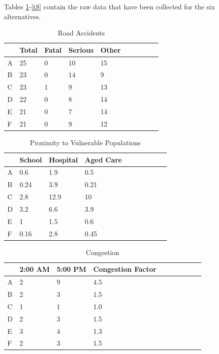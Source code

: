 \documentclass[11pt, a4paper]{article}
\begin{document}
    Tables \ref{t5}-\ref{t8} contain the raw data that have been collected for the six alternatives.

    \begin{table}[!ht]
        \centering
        \begin{tabular}{|l|l|l|l|l|l|l|l|l|l|}
        \hline
            ~ & Total & Fatal & Serious & Other       \\ \hline
            A & 25 & 0 & 10 & 15       \\ \hline
            B & 23 & 0 & 14 & 9       \\ \hline
            C & 23 & 1 & 9 & 13       \\ \hline
            D & 22 & 0 & 8 & 14       \\ \hline
            E & 21 & 0 & 7 & 14       \\ \hline
            F & 21 & 0 & 9 & 12       \\ \hline
        \end{tabular}
        \caption{Road Accidents}
        \label{t5}
    \end{table}

    \begin{table}[!ht]
        \centering
        \begin{tabular}{|l|l|l|l|l|l|l|l|l|l|}
        \hline
            ~ & School & Hospital & Aged Care        \\ \hline
            A & 0.6 & 1.9 & 0.5        \\ \hline
            B & 0.24 & 3.9 & 0.21        \\ \hline
            C & 2.8 & 12.9 & 10        \\ \hline
            D & 3.2 & 6.6 & 3.9        \\ \hline
            E & 1 & 1.5 & 0.6        \\ \hline
            F & 0.16 & 2.8 & 0.45        \\ \hline
        \end{tabular}
        \caption{Proximity to Vulnerable Populations}
        \label{t6}
    \end{table}

    \begin{table}[!ht]
        \centering
        \begin{tabular}{|l|l|l|l|l|l|l|l|l|l|}
        \hline
            ~ & 2:00 AM & 5:00 PM & Congestion Factor        \\ \hline
            A & 2 & 9 & 4.5        \\ \hline
            B & 2 & 3 & 1.5        \\ \hline
            C & 1 & 1 & 1.0        \\ \hline
            D & 2 & 3 & 1.5        \\ \hline
            E & 3 & 4 & 1.3        \\ \hline
            F & 2 & 3 & 1.5        \\ \hline
        \end{tabular}
        \caption{Congestion}
        \label{t7}
    \end{table}
\end{document}
